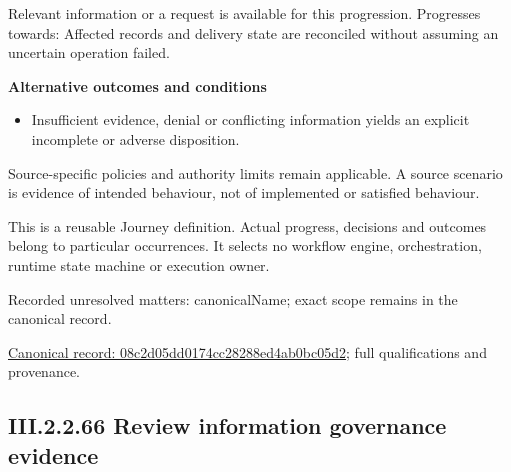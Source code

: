 Relevant information or a request is available for this progression. Progresses towards: Affected records and delivery state are reconciled without assuming an uncertain operation failed.



\par\medskip\textbf{Alternative outcomes and conditions}\par


\begin{itemize}


\item Insufficient evidence, denial or conflicting information yields an explicit incomplete or adverse disposition.

\end{itemize}


Source-specific policies and authority limits remain applicable. A source scenario is evidence of intended behaviour, not of implemented or satisfied behaviour.



This is a reusable Journey definition. Actual progress, decisions and outcomes belong to particular occurrences. It selects no workflow engine, orchestration, runtime state machine or execution owner.


{\small Recorded unresolved matters: canonicalName; exact scope remains in the canonical record.}\par
{\footnotesize \href{../../../../continuum/strategy/value-stream/08c2d05dd0174cc28288ed4ab0bc05d2.md}{Canonical record: 08c2d05dd0174cc28288ed4ab0bc05d2}; full qualifications and provenance.}\par
\subsection*{III.2.2.66 Review information governance evidence}
\label{navigation:III.2.2.66}

